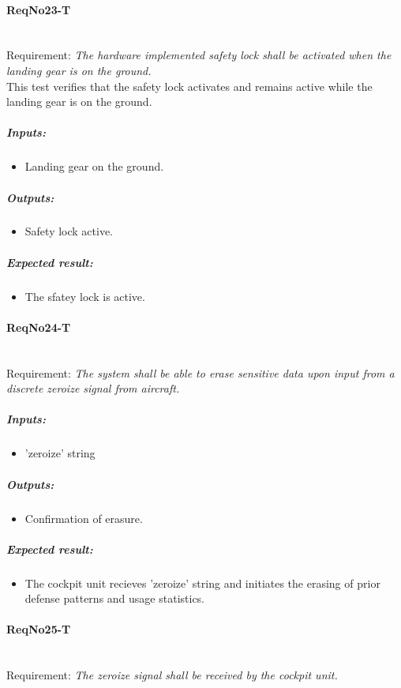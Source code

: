 \paragraph{ReqNo23-T}\mbox{}\\ %
Requirement: \textit{The hardware implemented safety lock shall be activated when the landing gear is on the ground.}
\\
This test verifies that the safety lock activates and remains active while the
landing gear is on the ground.
\\
	\subparagraph{Inputs:}
	\begin{itemize}
	\item Landing gear on the ground.
	\end{itemize}
	\subparagraph{Outputs:}
	\begin{itemize}
	\item Safety lock active.
	\end{itemize}
	\subparagraph{Expected result:}
	\begin{itemize}
	\item The sfatey lock is active.
	\end{itemize}


\paragraph{ReqNo24-T}\mbox{}\\ %
Requirement: \textit{The system shall be able to erase sensitive data upon input from a discrete zeroize signal from aircraft.}\\
	\subparagraph{Inputs:}
	\begin{itemize}
	\item 'zeroize' string
	\end{itemize}
	\subparagraph{Outputs:}
	\begin{itemize}
	\item Confirmation of erasure.
	\end{itemize}
	\subparagraph{Expected result:}
	\begin{itemize}
	\item The cockpit unit recieves 'zeroize' string and initiates the erasing of prior defense patterns and usage statistics.
	\end{itemize}


\paragraph{ReqNo25-T}\mbox{}\\ %
Requirement: \textit{The zeroize signal shall be received by the cockpit unit.}\\

